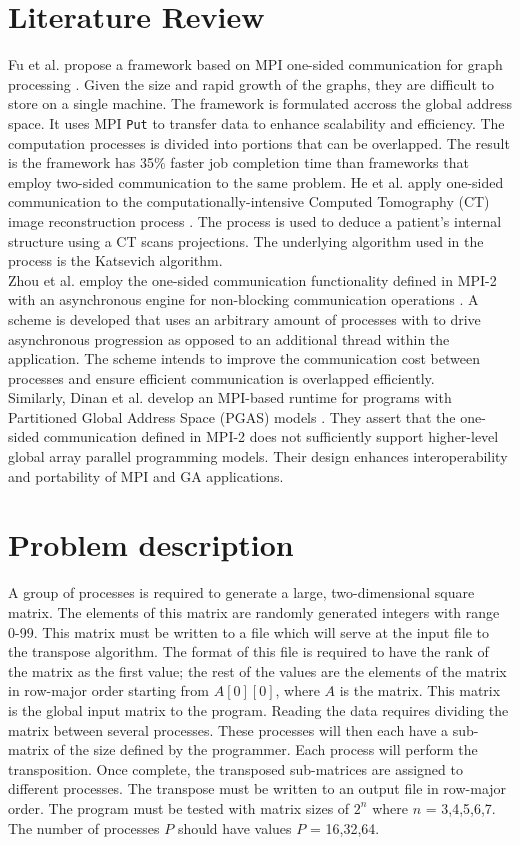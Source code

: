 \documentclass[a4paper, 11pt, twocolumn, conference]{IEEEtran}      %
\begin{document}
\section{Literature Review}\label{sec:lit}
Fu et al. propose a framework based on MPI one-sided communication for graph processing \cite{8411067}. Given the size and rapid growth of the graphs, they are difficult to store on a single machine. The framework is formulated accross the global address space. It uses MPI \texttt{Put} to transfer data to enhance scalability and efficiency. The computation processes is divided into portions that can be overlapped. The result is the framework has 35\% faster job completion time than frameworks that employ two-sided communication to the same problem. 
He et al. apply one-sided communication to the computationally-intensive Computed Tomography (CT) image reconstruction process \cite{4673583}. The process is used to deduce a patient's internal structure using a CT scans projections. The underlying algorithm used in the process is the Katsevich algorithm. \\
Zhou et al. employ the one-sided communication functionality defined in MPI-2 with an asynchronous engine for non-blocking communication operations \cite{7823848}. A scheme is developed that uses an arbitrary amount of processes with to drive asynchronous progression as opposed to an additional thread within the application. The scheme intends to improve the communication cost between processes and ensure efficient communication is overlapped efficiently. \\
Similarly, Dinan et al. develop an MPI-based runtime for programs with Partitioned Global Address Space (PGAS) models \cite{6267872}. They assert that the one-sided communication defined in MPI-2 does not sufficiently support higher-level global array parallel programming models. Their design enhances interoperability and portability of MPI and GA applications.\\

\section{Problem description}\label{sec:prob}
A group of processes is required to generate a large, two-dimensional square matrix. The elements of this matrix are randomly generated integers with range 0-99. This matrix must be written to a file which will serve at the input file to the transpose algorithm. The format of this file is required to have the rank of the matrix as the first value; the rest of the values are the elements of the matrix in row-major order starting from $A[0][0]$, where $A$ is the matrix. This matrix is the global input matrix to the program. Reading the data requires dividing the matrix between several processes. These processes will then each have a sub-matrix of the size defined by the programmer. Each process will perform the transposition. Once complete, the transposed sub-matrices are assigned to different processes. The transpose must be written to an output file in row-major order. The program must be tested with matrix sizes of $2^n$ where $n$ = {3,4,5,6,7}. The number of processes $P$ should have values $P$ = {16,32,64}. 
\end{document}

